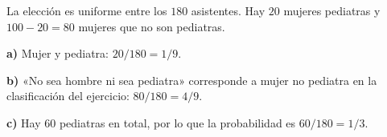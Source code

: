 La elección es uniforme entre los $180$ asistentes. Hay $20$ mujeres pediatras y $100-20=80$ mujeres que no son pediatras.

\textbf{a)} Mujer y pediatra: $20/180=\boxed{1/9}$.

\textbf{b)} «No sea hombre ni sea pediatra» corresponde a mujer no pediatra en la clasificación del ejercicio: $80/180=\boxed{4/9}$.

\textbf{c)} Hay $60$ pediatras en total, por lo que la probabilidad es $60/180=\boxed{1/3}$.
